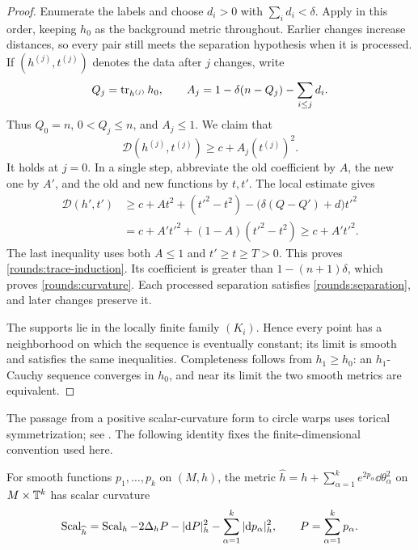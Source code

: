 \begin{proof}
Enumerate the labels and choose \(d_i>0\) with
\(\sum_i d_i<\delta\). Apply  in this order, keeping
\(h_0\) as the background metric throughout. Earlier changes increase
distances, so every pair still meets the separation hypothesis when it
is processed. If \((h^{(j)},t^{(j)})\) denotes the data after \(j\) changes,
write
\[
 Q_j=\operatorname{tr}_{h^{(j)}}h_0,\qquad
 A_j=1-\delta(n-Q_j)-\sum_{i\le j}d_i.
\]
Thus \(Q_0=n\), \(0<Q_j\le n\), and \(A_j\le1\).
We claim that
\begin{equation}\label{rounds:trace-induction}
 \mathcal D(h^{(j)},t^{(j)})\ge c+A_j(t^{(j)})^2.
\end{equation}
It holds at \(j=0\). In a single step, abbreviate the old coefficient
by \(A\), the new one by \(A'\), and the old and new functions by
\(t,t'\). The local estimate gives
\begin{align*}
 \mathcal D(h',t')
 &\ge c+At^2+(t'^2-t^2)
       -\bigl(\delta(Q-Q')+d\bigr)t'^2\\
 &=c+A't'^2+(1-A)(t'^2-t^2)\ge c+A't'^2.
\end{align*}
The last inequality uses both \(A\le1\) and \(t'\ge t\ge T>0\).
This proves \eqref{rounds:trace-induction}. Its coefficient is greater
than \(1-(n+1)\delta\), which proves \eqref{rounds:curvature}.
Each processed separation satisfies \eqref{rounds:separation}, and
later changes preserve it.

The supports lie in the locally finite family \((K_i)\). Hence every
point has a neighborhood on which the sequence is eventually constant;
its limit is smooth and satisfies the same inequalities. Completeness
follows from \(h_1\ge h_0\): an \(h_1\)-Cauchy sequence converges in
\(h_0\), and near its limit the two smooth metrics are equivalent.
\end{proof}

The passage from a positive scalar-curvature form to circle warps uses
torical symmetrization; see \citet[Section~2]{gromov2018Metric}. The
following identity fixes the finite-dimensional convention used here.

\begin{lemma}\label{rounds:warp-identity}
For smooth functions \(p_1,\ldots,p_k\) on \((M,h)\), the metric
\(\widehat h=h+\sum_{\alpha=1}^k e^{2p_\alpha}\dd\theta_\alpha^2\)
on \(M\times\mathbb T^k\) has scalar curvature
\[
 \operatorname{Scal}_{\widehat h}=\operatorname{Scal}_h-2\Delta_h P-|\mathrm d P|_h^2
                    -\sum_{\alpha=1}^k|\mathrm d p_\alpha|_h^2,
 \qquad P=\sum_{\alpha=1}^k p_\alpha.
\]
\end{lemma}

